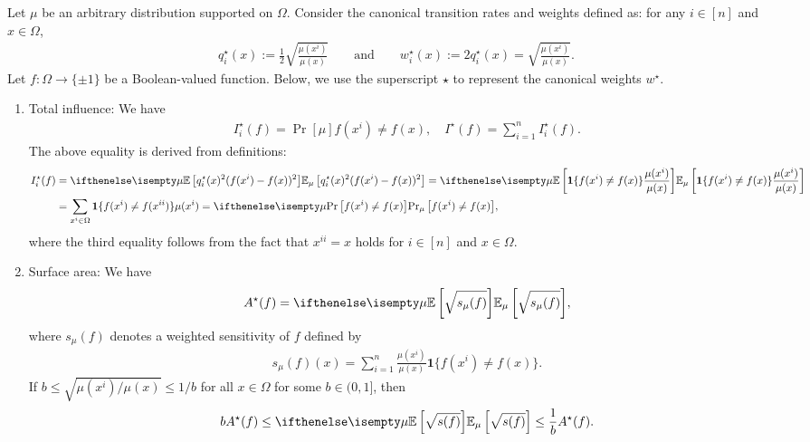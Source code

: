 \begin{example}
    Let $\mu$ be an arbitrary distribution supported on $\Omega$. 
    Consider the canonical transition rates and weights defined as: for any $i \in [n]$ and $x \in \Omega$,
    \begin{align*}
        q^\star_i(x) := \frac 12\sqrt{\frac{\mu(x^i)}{\mu(x)}}
        \qquad\text{and}\qquad
        w^\star_i(x) := 2q^\star_i(x) = \sqrt{\frac{\mu(x^i)}{\mu(x)}}.
    \end{align*}
    Let $f: \Omega \to \{\pm 1\}$ be a Boolean-valued function. 
    Below, we use the superscript $\star$ to represent the canonical weights $w^\star$.

    \begin{enumerate}[(1)]
        \item Total influence: We have
        \begin{align*}
            I^\star_i(f) = \Pr[\mu]{f(x^i) \neq f(x)}, \quad I^\star(f) = \sum_{i=1}^n I^\star_i(f).
        \end{align*}
        The above equality is derived from definitions:
        \begin{align*}
            I^\star_i(f) &= \E[\mu]{q_i^\star(x)^2 (f(x^i) - f(x))^2}
            = \E[\mu]{\ind\{f(x^i)\neq f(x)\}\frac{\mu(x^i)}{\mu(x)}}
            \\&= \sum_{x^i\in \Omega} \ind\{f(x^i)\neq f(x^{ii})\}\mu(x^i)
            = \Pr[\mu]{f(x^i) \neq f(x)},
        \end{align*}
        where the third equality follows from the fact that $x^{ii}=x$ holds for $i\in[n]$ and $x\in \Omega$.

        \item Surface area: We have
        \begin{align*}
            A^\star(f) = \E[\mu]{\sqrt{s_\mu(f)}},
        \end{align*}
        where $s_\mu(f)$ denotes a weighted sensitivity of $f$ defined by
        \begin{align*}
            s_\mu(f)(x) = \sum_{i=1}^n \frac{\mu(x^i)}{\mu(x)} \mathbf{1}\{f(x^i) \neq f(x)\}.
        \end{align*}
        If $b \le \sqrt{\mu(x^i)/\mu(x)} \le 1/b$ for all $x \in \Omega$ for some $b \in (0,1]$, then 
        \begin{align*}
            bA^\star(f) \le \E[\mu]{\sqrt{s(f)}} \le \frac 1b A^\star(f).
        \end{align*}


\end{enumerate}
\end{example}
